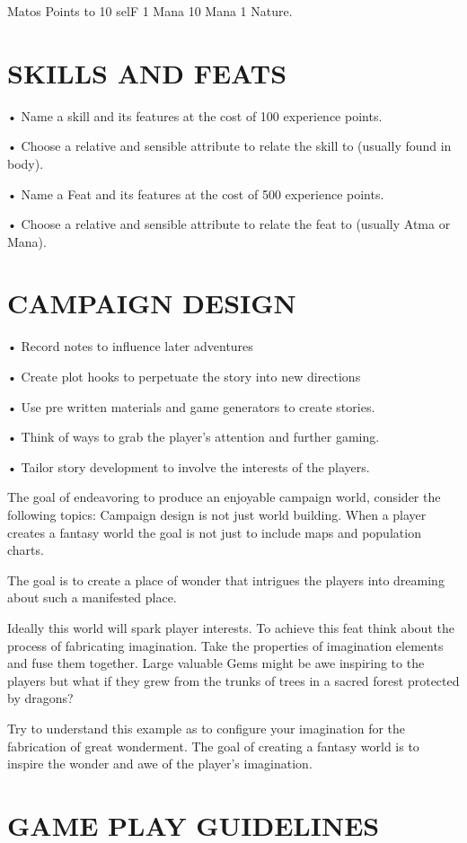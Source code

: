 \documentclass{article}
\begin{document}
Matos Points to 10 selF 1 Mana 10 Mana 1 Nature.

\section{SKILLS AND FEATS}

• Name a skill and its features at the cost of 100 experience points.

• Choose a relative and sensible attribute to relate the skill to (usually found in body).

• Name a Feat and its features at the cost of 500 experience points.

• Choose a relative and sensible attribute to relate the feat to (usually Atma or Mana).

\section{CAMPAIGN DESIGN}

• Record notes to influence later adventures

• Create plot hooks to perpetuate the story into new directions

• Use pre written materials and game generators to create stories.

• Think of ways to grab the player’s attention and further gaming.

• Tailor story development to involve the interests of the players.

	The goal of endeavoring to produce an enjoyable campaign world, consider the following topics:
Campaign design is not just world building. When a player creates a fantasy world the goal is not
just to include maps and population charts.

The goal is to create a place of wonder that intrigues the players into dreaming about such a
manifested place.

	Ideally this world will spark player interests. To achieve this feat think about the process of
fabricating imagination. Take the properties of imagination elements and fuse them together.
Large valuable Gems might be awe inspiring to the players but what if they grew from the trunks
of trees in a sacred forest protected by dragons?

	Try to understand this example as to configure your imagination for the fabrication of great
wonderment. The goal of creating a fantasy world is to inspire the wonder and awe of the
player’s imagination.

\section{GAME PLAY GUIDELINES}
	
\end{document}
